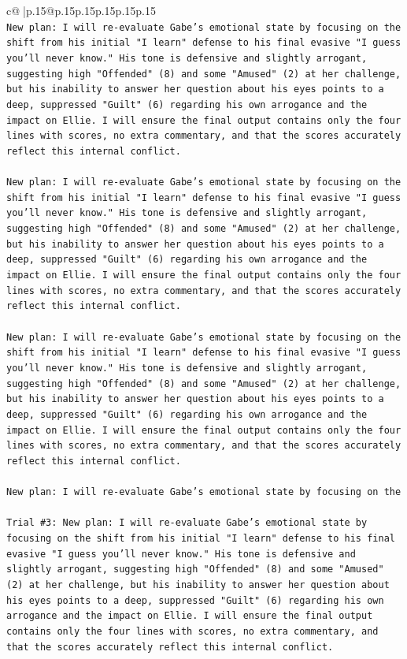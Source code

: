 \documentclass{article}
\begin{document}
{\begin{supertabular}{c@{$\;$}|p{.15\linewidth}@{}p{.15\linewidth}p{.15\linewidth}p{.15\linewidth}p{.15\linewidth}p{.15\linewidth}}
{{{\\ 
\texttt{New plan: I will re{-}evaluate Gabe's emotional state by focusing on the shift from his initial "I learn" defense to his final evasive "I guess you'll never know." His tone is defensive and slightly arrogant, suggesting high "Offended" (8) and some "Amused" (2) at her challenge, but his inability to answer her question about his eyes points to a deep, suppressed "Guilt" (6) regarding his own arrogance and the impact on Ellie. I will ensure the final output contains only the four lines with scores, no extra commentary, and that the scores accurately reflect this internal conflict.} \\
\\ 
\texttt{New plan: I will re{-}evaluate Gabe's emotional state by focusing on the shift from his initial "I learn" defense to his final evasive "I guess you'll never know." His tone is defensive and slightly arrogant, suggesting high "Offended" (8) and some "Amused" (2) at her challenge, but his inability to answer her question about his eyes points to a deep, suppressed "Guilt" (6) regarding his own arrogance and the impact on Ellie. I will ensure the final output contains only the four lines with scores, no extra commentary, and that the scores accurately reflect this internal conflict.} \\
\\ 
\texttt{New plan: I will re{-}evaluate Gabe's emotional state by focusing on the shift from his initial "I learn" defense to his final evasive "I guess you'll never know." His tone is defensive and slightly arrogant, suggesting high "Offended" (8) and some "Amused" (2) at her challenge, but his inability to answer her question about his eyes points to a deep, suppressed "Guilt" (6) regarding his own arrogance and the impact on Ellie. I will ensure the final output contains only the four lines with scores, no extra commentary, and that the scores accurately reflect this internal conflict.} \\
\\ 
\texttt{New plan: I will re{-}evaluate Gabe's emotional state by focusing on the} \\
\\ 
\texttt{Trial \#3: New plan: I will re{-}evaluate Gabe's emotional state by focusing on the shift from his initial "I learn" defense to his final evasive "I guess you'll never know." His tone is defensive and slightly arrogant, suggesting high "Offended" (8) and some "Amused" (2) at her challenge, but his inability to answer her question about his eyes points to a deep, suppressed "Guilt" (6) regarding his own arrogance and the impact on Ellie. I will ensure the final output contains only the four lines with scores, no extra commentary, and that the scores accurately reflect this internal conflict.} \\
}}}
\end{supertabular}}
\end{document}
